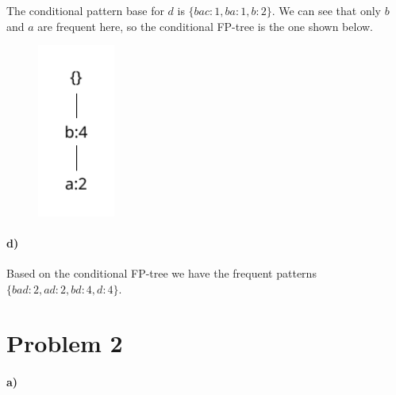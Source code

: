 \documentclass[12pt]{article}
\begin{document}
The conditional pattern base for \(d\) is \(\{bac:1, ba:1, b:2\}\). We can see that only \(b\) and \(a\) are
frequent here, so the conditional FP-tree is the one shown below.
\begin{figure}[H]
    \begin{center}
        \includegraphics[width=1in]{problem1c.pdf}
    \end{center}
\end{figure}

\paragraph{d)}

Based on the conditional FP-tree we have the frequent patterns \(\{bad:2, ad:2, bd:4, d:4\}\).

\section*{Problem 2}

\paragraph{a)}
\end{document}
